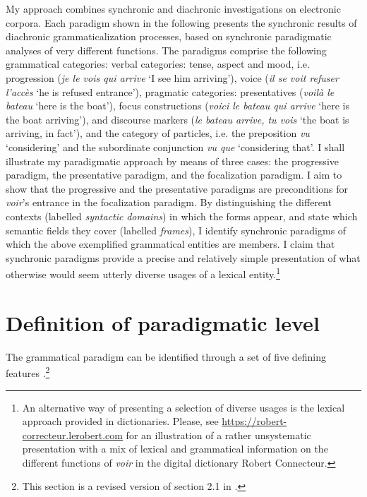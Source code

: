 \documentclass[output=paper]{langsci/langscibook}
\begin{document}
\begin{sloppypar}
My approach combines synchronic and diachronic investigations on electronic corpora. Each paradigm shown in the following presents the synchronic results of diachronic grammaticalization processes, based on synchronic paradigmatic analyses of very different functions. The paradigms comprise the following grammatical categories: verbal categories: tense, aspect and mood, i.e. progression (\textit{je le vois qui arrive} ‘I see him arriving’), voice (\textit{il se voit refuser l’accès} ‘he is refused entrance’), pragmatic categories: presentatives (\textit{voilà le bateau} ‘here is the boat’), focus constructions (\textit{voici le bateau qui arrive} ‘here is the boat arriving’), and discourse markers (\textit{le bateau arrive, tu vois} ‘the boat is arriving, in fact’), and the category of particles, i.e. the preposition \textit{vu} ‘considering’ and the subordinate conjunction \textit{vu que} ‘considering that’. I shall illustrate my paradigmatic approach by means of three cases: the progressive paradigm, the presentative paradigm, and the focalization paradigm. I aim to show that the progressive and the presentative paradigms are preconditions for \textit{voir}’s entrance in the focalization paradigm. By distinguishing the different contexts (labelled \textit{syntactic} \textit{domains}) in which the forms appear, and state which semantic fields they cover (labelled \textit{frames}), I identify synchronic paradigms of which the above exemplified grammatical entities are members. I claim that synchronic paradigms provide a precise and relatively simple presentation of what otherwise would seem utterly diverse usages of a lexical entity.\footnote{An alternative way of presenting a selection of diverse usages is the lexical approach provided in dictionaries. Please, see \url{https://robert-correcteur.lerobert.com} for an illustration of a rather unsystematic presentation with a mix of lexical and grammatical information on the different functions of \textit{voir} in the digital dictionary Robert Connecteur.}
\end{sloppypar}


\section{Definition of paradigmatic level} \label{kragh:2}

The grammatical paradigm can be identified through a set of five defining features \citep[5--6]{Nørgård-Sørensen2011}.\footnote{This section is a revised version of section 2.1 in \citet{KraghSchosler2015}.}
\end{document}
